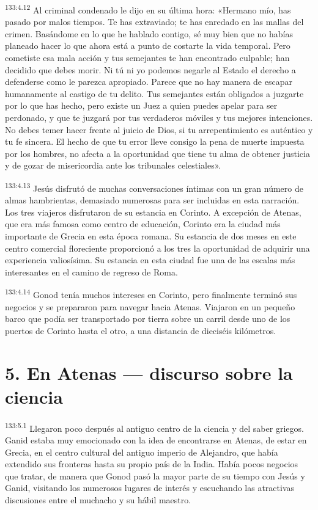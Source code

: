 \par 
\textsuperscript{133:4.12} Al criminal condenado le dijo en su última hora: «Hermano mío, has pasado por malos tiempos. Te has extraviado; te has enredado en las mallas del crimen. Basándome en lo que he hablado contigo, sé muy bien que no habías planeado hacer lo que ahora está a punto de costarte la vida temporal. Pero cometiste esa mala acción y tus semejantes te han encontrado culpable; han decidido que debes morir. Ni tú ni yo podemos negarle al Estado el derecho a defenderse como le parezca apropiado. Parece que no hay manera de escapar humanamente al castigo de tu delito. Tus semejantes están obligados a juzgarte por lo que has hecho, pero existe un Juez a quien puedes apelar para ser perdonado, y que te juzgará por tus verdaderos móviles y tus mejores intenciones. No debes temer hacer frente al juicio de Dios, si tu arrepentimiento es auténtico y tu fe sincera. El hecho de que tu error lleve consigo la pena de muerte impuesta por los hombres, no afecta a la oportunidad que tiene tu alma de obtener justicia y de gozar de misericordia ante los tribunales celestiales».

\par 
\textsuperscript{133:4.13} Jesús disfrutó de muchas conversaciones íntimas con un gran número de almas hambrientas, demasiado numerosas para ser incluidas en esta narración. Los tres viajeros disfrutaron de su estancia en Corinto. A excepción de Atenas, que era más famosa como centro de educación, Corinto era la ciudad más importante de Grecia en esta época romana. Su estancia de dos meses en este centro comercial floreciente proporcionó a los tres la oportunidad de adquirir una experiencia valiosísima. Su estancia en esta ciudad fue una de las escalas más interesantes en el camino de regreso de Roma.

\par 
\textsuperscript{133:4.14} Gonod tenía muchos intereses en Corinto, pero finalmente terminó sus negocios y se prepararon para navegar hacia Atenas. Viajaron en un pequeño barco que podía ser transportado por tierra sobre un carril desde uno de los puertos de Corinto hasta el otro, a una distancia de dieciséis kilómetros.

\section*{5. En Atenas --- discurso sobre la ciencia}
\par 
\textsuperscript{133:5.1} Llegaron poco después al antiguo centro de la ciencia y del saber griegos. Ganid estaba muy emocionado con la idea de encontrarse en Atenas, de estar en Grecia, en el centro cultural del antiguo imperio de Alejandro, que había extendido sus fronteras hasta su propio país de la India. Había pocos negocios que tratar, de manera que Gonod pasó la mayor parte de su tiempo con Jesús y Ganid, visitando los numerosos lugares de interés y escuchando las atractivas discusiones entre el muchacho y su hábil maestro.

